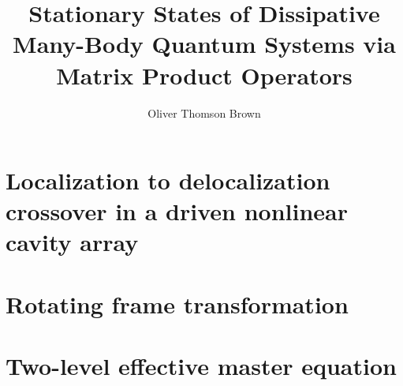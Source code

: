 \documentclass[a4paper,oneside,12pt]{hwthesis}
\author{Oliver Thomson Brown}
\title{Stationary States of Dissipative Many-Body Quantum Systems via Matrix Product Operators}
\newcommand*{\chappath}{../../include/chapters}
\newcommand*{\refpath}{../../include/refs}
\begin{document}
\maketitle
\tableofcontents

\chapter[Driven nonlinear cavity array]{\label{chp:DNLCA}Localization to delocalization crossover in a driven nonlinear cavity array}



\appendix

\chapter[Rotating frame]{\label{chp:rotframe}Rotating frame transformation}



\chapter{\label{chp:adelim}Two-level effective master equation}





\end{document}
